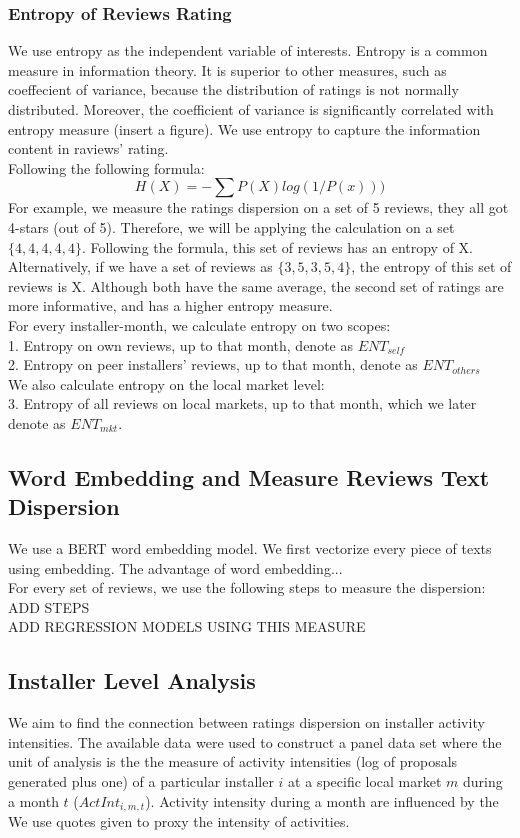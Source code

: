 \documentclass[msom,blindrev]{informs3}
\begin{document}
\subsubsection{Entropy of Reviews Rating}
We use entropy as the independent variable of interests. Entropy is a common measure in information theory. It is superior to other measures, such as coeffecient of variance, because the distribution of ratings is not normally distributed. Moreover, the coefficient of variance is significantly correlated with entropy measure (insert a figure). We use entropy to capture the information content in raviews' rating. \\ 
Following the following formula:  \\ 
\begin{equation}
H(X)=-\sum P(X)log(1/P(x)))
\end{equation}
For example, we measure the ratings dispersion on a set of 5 reviews, they all got 4-stars (out of 5). Therefore, we will be applying the calculation on a set $\{4,4,4,4,4\}$. Following the formula, this set of reviews has an entropy of X. Alternatively, if we have a set of reviews as $\{3,5,3,5,4\}$, the entropy of this set of reviews is X. Although both have the same average, the second set of ratings are more informative, and has a higher entropy measure. \\

For every installer-month, we calculate entropy on two scopes: \\
1. Entropy on own reviews, up to that month, denote as $ENT_{self}$ \\ 
2. Entropy on peer installers' reviews, up to that month, denote as $ENT_{others}$ \\
We also calculate entropy on the local market level:\\
3. Entropy of all reviews on local markets, up to that month, which we later denote as $ENT_{mkt}$. 
\subsection{Word Embedding and Measure Reviews Text Dispersion}
We use a BERT word embedding model. We first vectorize every piece of texts using embedding. The advantage of word embedding... \\
For every set of reviews, we use the following steps to measure the dispersion: ADD STEPS \\
ADD REGRESSION MODELS USING THIS MEASURE 
\subsection{Installer Level Analysis}
We aim to find the connection between ratings dispersion on installer activity intensities. The available data were used to construct a panel data set where the unit of analysis is the the measure of activity intensities (log of proposals generated plus one) of a particular installer $i$ at a specific local market $m$ during a month $t$ ($ActInt_{i,m,t}$). Activity intensity during a month are influenced by the  
We use quotes given to proxy the intensity of activities. 
\end{document}
